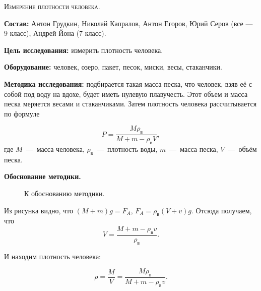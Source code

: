 \begin{center}
  \textsc{Измерение плотности человека. }
\end{center}

\textbf{Состав:} Антон Грудкин, Николай Капралов, Антон
Егоров, Юрий Серов (все --- 9 класс), Андрей Йона (7 класс).

\textbf{Цель исследования:} измерить плотность человека. 

\textbf{Оборудование:} человек, озеро, пакет, песок, миски, весы, стаканчики.

\textbf{Методика исследования:} подбирается такая масса песка, что
человек, взяв её с собой под воду на вдохе, будет иметь нулевую
плавучесть. Этот объем и масса песка меряется весами и
стаканчиками. Затем плотность человека рассчитывается по формуле

\begin{equation}
  \label{eq:bz09_01}
  P = \frac{M \rho_{\text{в}}}{M + m - \rho_{\text{в}} V},
\end{equation}
где $M$~---~масса человека, $\rho_{\text{в}}$~---~плотность воды,
$m$~---~масса песка, $V$~---~объём песка. 

\begin{center}
  \textbf{Обоснование методики.}  
\end{center}

\begin{figure}[ht]
  \centering
  \caption{К обоснованию методики.}
  \label{fig:bz09_density}
\end{figure}

Из рисунка видно, что $(M+m)g=F_A$, $F_A = \rho_{\text{в}} (V+v)
g$. Отсюда получаем, что
\begin{equation}
  \label{eq:bz09_1}
  V= \frac{M+m-\rho_{\text{в}} v} {\rho_{\text{в}}}.
\end{equation}

И находим плотность человека: 

\begin{equation}
  \label{eq:bz09_2}
  \rho = \frac{M}{V} = \frac{M \rho_{\text{в}}} {M+m-\rho_{\text{в}} v}.
\end{equation}

